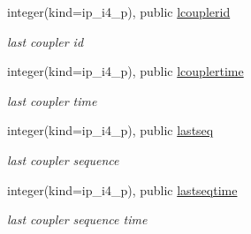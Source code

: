 \begin{DoxyCompactItemize}
integer(kind=ip\+\_\+i4\+\_\+p), public \hyperlink{classmod__oasis__coupler_a2e4d905b50abb50cea9382a8b58e3e0c}{lcouplerid}
\begin{DoxyCompactList}\small\item\em last coupler id \end{DoxyCompactList}\item 
integer(kind=ip\+\_\+i4\+\_\+p), public \hyperlink{classmod__oasis__coupler_a477b53431b7aa1d2b311a78e5db7f00f}{lcouplertime}
\begin{DoxyCompactList}\small\item\em last coupler time \end{DoxyCompactList}\item 
integer(kind=ip\+\_\+i4\+\_\+p), public \hyperlink{classmod__oasis__coupler_a0cb9b8a96c10385d38fa244d920c7eaf}{lastseq}
\begin{DoxyCompactList}\small\item\em last coupler sequence \end{DoxyCompactList}\item 
integer(kind=ip\+\_\+i4\+\_\+p), public \hyperlink{classmod__oasis__coupler_a47f4727f94719892d837f6a1545d3d08}{lastseqtime}
\begin{DoxyCompactList}\small\item\em last coupler sequence time \end{DoxyCompactList}\end{DoxyCompactItemize}

